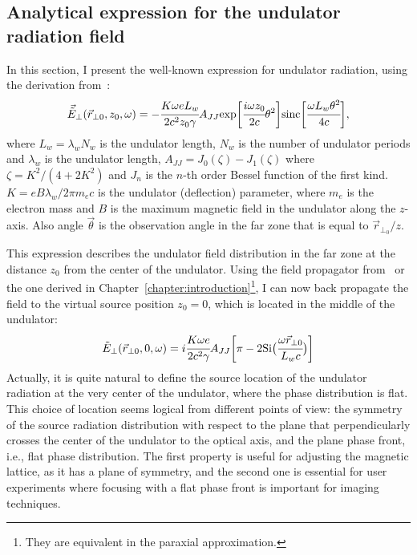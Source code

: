 \subsection{Analytical expression for the undulator radiation field}
    In this section, I present the well-known expression for undulator radiation, using the derivation from~\cite{geloni_fourier_2007}:
    \begin{align}
        \vec{\tilde{E}}_{\perp}(\vec{r}_{\perp 0}, z_0, \omega) = - \cfrac{K \omega e L_w}{2 c^2 z_0 \gamma} A_{JJ} \textup{exp}{\bigg[\cfrac{i\omega z_0}{2 c}\theta^2 \bigg]} \textup{sinc}{\bigg[\cfrac{\omega L_w \theta^2}{4 c} \bigg]}, 
        \label{Eq:und_field_far}
    \end{align}
    where $L_w = \lambda_w N_w$ is the undulator length, $N_w$ is the number of undulator periods and $\lambda_w$ is the undulator length, $A_{JJ} = J_0(\zeta) - J_1(\zeta)$ where $\zeta = K^2 / (4 + 2 K^2)$ and $J_n$ is the $n$-th order Bessel function of the first kind. $K = e B \lambda_w/ 2 \pi m_e c$ is the undulator (deflection) parameter, where $m_e$ is the electron mass and $B$ is the maximum magnetic field in the undulator along the $z$-axis. Also angle $\vec{\theta}$ is the observation angle in the far zone that is equal to $\vec{r}_{\perp_0}/z$. 

    This expression describes the undulator field distribution in the far zone at the distance $z_0$ from the center of the undulator. Using the field propagator from~\cite{geloni_fourier_2007} or the one derived in Chapter~\ref{chapter:introduction}\footnote{They are equivalent in the paraxial approximation.}, I can now back propagate the field to the virtual source position $z_0 = 0$, which is located in the middle of the undulator:
    \begin{align}
        \tilde{E}_{\perp}(\vec{r}_{\perp 0}, 0, \omega) = i \cfrac{K \omega e}{2 c^2 \gamma} A_{JJ} \bigg[\pi - 2\textup{Si}\big(\cfrac{\omega \vec{r}_{\perp 0}}{L_w c}\big) \bigg]
        \label{Eq:und_field_source}
    \end{align}
    Actually, it is quite natural to define the source location of the undulator radiation at the very center of the undulator, where the phase distribution is flat. This choice of location seems logical from different points of view: the symmetry of the source radiation distribution with respect to the plane that perpendicularly crosses the center of the undulator to the optical axis, and the plane phase front, i.e., flat phase distribution. The first property is useful for adjusting the magnetic lattice, as it has a plane of symmetry, and the second one is essential for user experiments where focusing with a flat phase front is important for imaging techniques.
    

